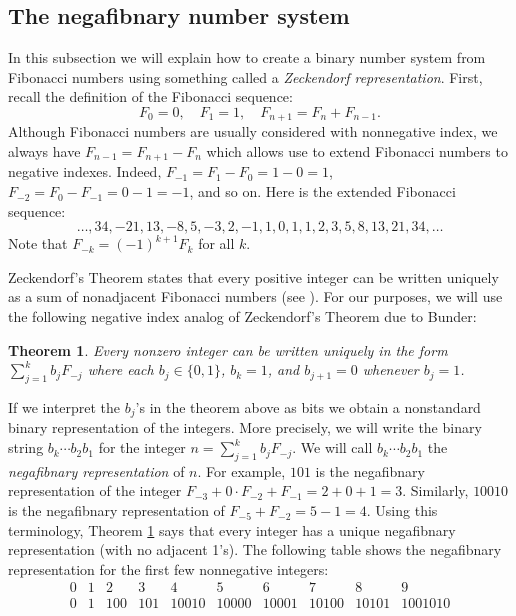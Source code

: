 \documentclass[reqno]{amsart}
\newtheorem{theorem}{Theorem}[section]
\theoremstyle{definition}
\begin{document}
\subsection{The negafibnary number system} \label{subsection: negafibnary}
In this subsection we will explain how to create a binary number system from Fibonacci numbers using something called a \emph{Zeckendorf representation}. First, recall the definition of the Fibonacci sequence:
\begin{equation*}\label{equation: Fibonacci defintion}
    F_0 = 0, \quad F_1 = 1, \quad F_{n+1} = F_{n} + F_{n-1}.
\end{equation*}
Although Fibonacci numbers are usually considered with nonnegative index, we always have $F_{n-1}=F_{n+1}-F_n$ which allows use to extend Fibonacci numbers to negative indexes. Indeed, $F_{-1}=F_1-F_0=1-0=1$,  $F_{-2}=F_0-F_{-1}=0-1=-1$, and so on. Here is the extended Fibonacci sequence:
\begin{equation*}
    \ldots,34,-21,13,-8,5,-3,2,-1,1,0,1,1,2,3,5,8,13,21,34,\ldots
\end{equation*}
Note that $F_{-k}=(-1)^{k+1}F_k$ for all $k$. 

Zeckendorf's Theorem states that every positive integer can be written uniquely as a sum of nonadjacent Fibonacci numbers (see \cite{Zeckendorf}). For our purposes, we will use the following negative index analog of Zeckendorf's Theorem due to Bunder:

\begin{theorem}\label{theorem: Bunder-Zeckendorf} \cite{Bunder} 
    Every nonzero integer can be written uniquely in the form $\sum\limits_{j=1}^k b_jF_{-j}$ where each $b_j\in\{0,1\}$, $b_k=1$, and $b_{j+1}=0$ whenever $b_j=1$.
\end{theorem}  

If we interpret the $b_j$'s in the theorem above as bits we obtain a nonstandard binary representation of the integers. More precisely, we will write the binary string $b_k\cdots b_2b_1$ for the integer $n=\sum\limits_{j=1}^k b_jF_{-j}$. We will call $b_k\cdots b_2b_1$ the \emph{negafibnary representation} of $n$.  For example, $101$ is the negafibnary representation of the integer $F_{-3}+0\cdot F_{-2}+F_{-1}=2+0+1=3$. Similarly, $10010$ is the negafibnary representation of $F_{-5}+F_{-2}=5-1=4$. Using this terminology, Theorem \ref{theorem: Bunder-Zeckendorf} says that every integer has a unique negafibnary representation (with no adjacent 1's). The following table shows the negafibnary representation for the first few nonnegative integers:
\[\begin{array}{cccccccccc}
    0 & 1 &  2  &  3  &   4   &   5   &   6   &   7   &   8   &    9    \\ \hline
    0 & 1 & 100 & 101 & 10010 & 10000 & 10001 & 10100 & 10101 & 1001010 
\end{array}\]
\end{document}
